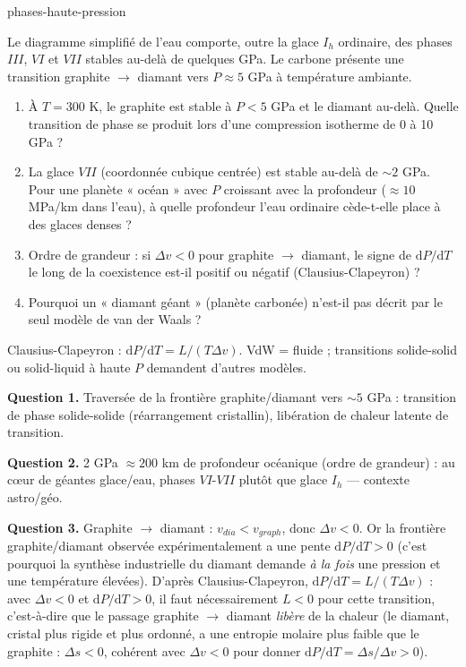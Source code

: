 \begin{exo}{phases-haute-pression}

Le diagramme simplifié de l'eau comporte, outre la glace $I_h$ ordinaire, des phases $III$, $VI$ et $VII$ stables au-delà de quelques GPa. Le carbone présente une transition graphite $\to$ diamant vers $P \approx 5$ GPa à température ambiante.

\begin{enumerate}
\item À $T = 300$ K, le graphite est stable à $P < 5$ GPa et le diamant au-delà. Quelle transition de phase se produit lors d'une compression isotherme de 0 à 10 GPa ?
\item La glace $VII$ (coordonnée cubique centrée) est stable au-delà de $\sim 2$ GPa. Pour une planète « océan » avec $P$ croissant avec la profondeur ($\approx 10$ MPa/km dans l'eau), à quelle profondeur l'eau ordinaire cède-t-elle place à des glaces denses ?
\item Ordre de grandeur : si $\Delta v < 0$ pour graphite $\to$ diamant, le signe de $\mathrm{d}P/\mathrm{d}T$ le long de la coexistence est-il positif ou négatif (Clausius-Clapeyron) ?
\item Pourquoi un « diamant géant » (planète carbonée) n'est-il pas décrit par le seul modèle de van der Waals ?
\end{enumerate}

\begin{indication}
Clausius-Clapeyron : $\mathrm{d}P/\mathrm{d}T = L/(T\Delta v)$. VdW = fluide ; transitions solide-solid ou solid-liquid à haute $P$ demandent d'autres modèles.
\end{indication}

\begin{solution}
\textbf{Question 1.} Traversée de la frontière graphite/diamant vers $\sim 5$ GPa : transition de phase solide-solide (réarrangement cristallin), libération de chaleur latente de transition.

\textbf{Question 2.} 2 GPa $\approx 200$ km de profondeur océanique (ordre de grandeur) : au c\oe ur de géantes glace/eau, phases $VI$-$VII$ plutôt que glace $I_h$ — contexte astro/géo.

\textbf{Question 3.} Graphite $\to$ diamant : $v_{dia} < v_{graph}$, donc $\Delta v < 0$. Or la frontière graphite/diamant observée expérimentalement a une pente $\mathrm{d}P/\mathrm{d}T > 0$ (c'est pourquoi la synthèse industrielle du diamant demande \emph{à la fois} une pression et une température élevées). D'après Clausius-Clapeyron, $\mathrm{d}P/\mathrm{d}T = L/(T\Delta v)$ : avec $\Delta v < 0$ et $\mathrm{d}P/\mathrm{d}T > 0$, il faut nécessairement $L < 0$ pour cette transition, c'est-à-dire que le passage graphite $\to$ diamant \emph{libère} de la chaleur (le diamant, cristal plus rigide et plus ordonné, a une entropie molaire plus faible que le graphite : $\Delta s < 0$, cohérent avec $\Delta v < 0$ pour donner $\mathrm{d}P/\mathrm{d}T = \Delta s/\Delta v > 0$).


\end{solution}
\end{exo}
